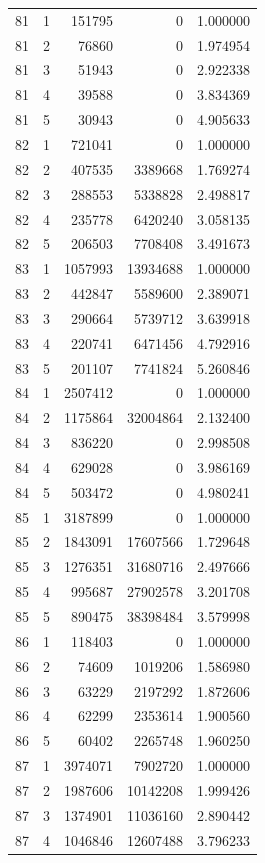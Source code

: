 \begin{longtable}{rrrrr}
81 & 1 & 151795 & 0 & 1.000000 \\
81 & 2 & 76860 & 0 & 1.974954 \\
81 & 3 & 51943 & 0 & 2.922338 \\
81 & 4 & 39588 & 0 & 3.834369 \\
81 & 5 & 30943 & 0 & 4.905633 \\
82 & 1 & 721041 & 0 & 1.000000 \\
82 & 2 & 407535 & 3389668 & 1.769274 \\
82 & 3 & 288553 & 5338828 & 2.498817 \\
82 & 4 & 235778 & 6420240 & 3.058135 \\
82 & 5 & 206503 & 7708408 & 3.491673 \\
83 & 1 & 1057993 & 13934688 & 1.000000 \\
83 & 2 & 442847 & 5589600 & 2.389071 \\
83 & 3 & 290664 & 5739712 & 3.639918 \\
83 & 4 & 220741 & 6471456 & 4.792916 \\
83 & 5 & 201107 & 7741824 & 5.260846 \\
84 & 1 & 2507412 & 0 & 1.000000 \\
84 & 2 & 1175864 & 32004864 & 2.132400 \\
84 & 3 & 836220 & 0 & 2.998508 \\
84 & 4 & 629028 & 0 & 3.986169 \\
84 & 5 & 503472 & 0 & 4.980241 \\
85 & 1 & 3187899 & 0 & 1.000000 \\
85 & 2 & 1843091 & 17607566 & 1.729648 \\
85 & 3 & 1276351 & 31680716 & 2.497666 \\
85 & 4 & 995687 & 27902578 & 3.201708 \\
85 & 5 & 890475 & 38398484 & 3.579998 \\
86 & 1 & 118403 & 0 & 1.000000 \\
86 & 2 & 74609 & 1019206 & 1.586980 \\
86 & 3 & 63229 & 2197292 & 1.872606 \\
86 & 4 & 62299 & 2353614 & 1.900560 \\
86 & 5 & 60402 & 2265748 & 1.960250 \\
87 & 1 & 3974071 & 7902720 & 1.000000 \\
87 & 2 & 1987606 & 10142208 & 1.999426 \\
87 & 3 & 1374901 & 11036160 & 2.890442 \\
87 & 4 & 1046846 & 12607488 & 3.796233 \\

\end{longtable}
